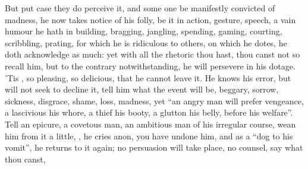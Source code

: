 
But put case they do perceive it, and some one be manifestly convicted of
madness, he now takes notice of his folly, be it in action,
gesture, speech, a vain humour he hath in building, bragging, jangling,
spending, gaming, courting, scribbling, prating, for which he is ridiculous to
others, on which he dotes, he doth acknowledge as much: yet
with all the rhetoric thou hast, thou canst not so recall him, but to the
contrary notwithstanding, he will persevere in his dotage. 'Tis , so pleasing, so delicious, that he
cannot leave it. He knows his error, but will not seek to
decline it, tell him what the event will be, beggary, sorrow, sickness,
disgrace, shame, loss, madness, yet \enquote{an angry man will
prefer vengeance, a lascivious his whore, a thief his booty, a glutton his
belly, before his welfare}. Tell an epicure, a covetous man, an ambitious man
of his irregular course, wean him from it a little, , he cries anon, you have undone him, and as a \enquote{dog
to his vomit}, he returns to it again; no persuasion will take place, no
counsel, say what thou canst,


